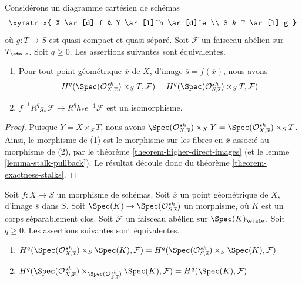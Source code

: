 \begin{lemma}
\label{lemma-base-change-f-star-general-stalks}
Considérons un diagramme cartésien de schémas
$$
\xymatrix{
X \ar[d]_f & Y \ar[l]^h \ar[d]^e \\
S & T \ar[l]_g
}
$$
où $g : T \to S$ est quasi-compact et quasi-séparé.
Soit $\mathcal{F}$ un
faisceau abélien sur $T_\etale$. Soit $q \geq 0$. Les assertions suivantes sont équivalentes.
\begin{enumerate}
\item Pour tout point géométrique $\overline{x}$ de $X$, d'image
$\overline{s} = f(\overline{x})$, nous avons
$$
H^q(\Spec(\mathcal{O}^{sh}_{X, \overline{x}}) \times_S T, \mathcal{F})
=
H^q(\Spec(\mathcal{O}^{sh}_{S, \overline{s}}) \times_S T, \mathcal{F})
$$
\item $f^{-1}R^qg_*\mathcal{F} \to R^qh_*e^{-1}\mathcal{F}$
est un isomorphisme.
\end{enumerate}
\end{lemma}

\begin{proof}
Puisque $Y = X \times_S T$, nous avons
$\Spec(\mathcal{O}^{sh}_{X, \overline{x}}) \times_X Y =
\Spec(\mathcal{O}^{sh}_{X, \overline{x}}) \times_S T$. Ainsi,
le morphisme de (1) est le morphisme sur les fibres en $\overline{x}$ associé au morphisme
de (2), par le théorème \ref{theorem-higher-direct-images} (et le
lemme \ref{lemma-stalk-pullback}).
Le résultat découle donc du théorème \ref{theorem-exactness-stalks}.
\end{proof}

\begin{lemma}
\label{lemma-check-stalks-better}
Soit $f : X \to S$ un morphisme de schémas.
Soit $\overline{x}$ un point géométrique de $X$, d'image $\overline{s}$ dans $S$.
Soit $\Spec(K) \to \Spec(\mathcal{O}^{sh}_{S, \overline{s}})$
un morphisme, où $K$ est un corps séparablement clos. Soit $\mathcal{F}$ un
faisceau abélien sur $\Spec(K)_\etale$. Soit $q \geq 0$. Les assertions suivantes sont
équivalentes.
\begin{enumerate}
\item
$H^q(\Spec(\mathcal{O}^{sh}_{X, \overline{x}}) \times_S \Spec(K), \mathcal{F}) =
H^q(\Spec(\mathcal{O}^{sh}_{S, \overline{s}}) \times_S \Spec(K), \mathcal{F})$
\item
$H^q(\Spec(\mathcal{O}^{sh}_{X, \overline{x}})
\times_{\Spec(\mathcal{O}^{sh}_{S, \overline{s}})} \Spec(K), \mathcal{F}) =
H^q(\Spec(K), \mathcal{F})$
\end{enumerate}
\end{lemma}

